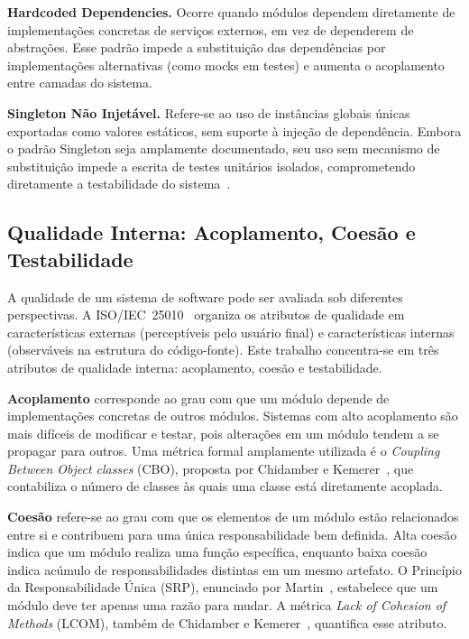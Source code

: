 \documentclass[sigconf,anonymous]{acmart}
\begin{document}
\textbf{Hardcoded Dependencies.} Ocorre quando módulos dependem diretamente de implementações concretas de serviços externos, em vez de dependerem de abstrações. Esse padrão impede a substituição das dependências por implementações alternativas (como mocks em testes) e aumenta o acoplamento entre camadas do sistema.

\textbf{Singleton Não Injetável.} Refere-se ao uso de instâncias globais únicas exportadas como valores estáticos, sem suporte à injeção de dependência. Embora o padrão Singleton seja amplamente documentado, seu uso sem mecanismo de substituição impede a escrita de testes unitários isolados, comprometendo diretamente a testabilidade do sistema~\cite{Feathers2004}.


\subsection{Qualidade Interna: Acoplamento, Coesão e Testabilidade}

A qualidade de um sistema de software pode ser avaliada sob diferentes perspectivas. A ISO/IEC~25010~\cite{ISO25010} organiza os atributos de qualidade em características externas (perceptíveis pelo usuário final) e características internas (observáveis na estrutura do código-fonte). Este trabalho concentra-se em três atributos de qualidade interna: acoplamento, coesão e testabilidade.

\textbf{Acoplamento} corresponde ao grau com que um módulo depende de implementações concretas de outros módulos. Sistemas com alto acoplamento são mais difíceis de modificar e testar, pois alterações em um módulo tendem a se propagar para outros. Uma métrica formal amplamente utilizada é o \textit{Coupling Between Object classes} (CBO), proposta por Chidamber e Kemerer~\cite{Chidamber1994}, que contabiliza o número de classes às quais uma classe está diretamente acoplada.

\textbf{Coesão} refere-se ao grau com que os elementos de um módulo estão relacionados entre si e contribuem para uma única responsabilidade bem definida. Alta coesão indica que um módulo realiza uma função específica, enquanto baixa coesão indica acúmulo de responsabilidades distintas em um mesmo artefato. O Princípio da Responsabilidade Única (SRP), enunciado por Martin~\cite{Martin2017}, estabelece que um módulo deve ter apenas uma razão para mudar. A métrica \textit{Lack of Cohesion of Methods} (LCOM), também de Chidamber e Kemerer~\cite{Chidamber1994}, quantifica esse atributo.
\end{document}
